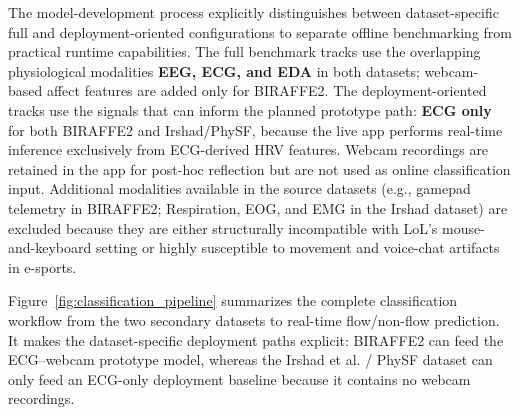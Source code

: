 The model-development process explicitly distinguishes between dataset-specific full and deployment-oriented configurations to separate offline benchmarking from practical runtime capabilities. The full benchmark tracks use the overlapping physiological modalities \textbf{EEG, ECG, and EDA} in both datasets; webcam-based affect features are added only for BIRAFFE2. The deployment-oriented tracks use the signals that can inform the planned prototype path: \textbf{ECG only} for both BIRAFFE2 and Irshad/PhySF, because the live app performs real-time inference exclusively from ECG-derived HRV features. Webcam recordings are retained in the app for post-hoc reflection but are not used as online classification input. Additional modalities available in the source datasets (e.g., gamepad telemetry in BIRAFFE2; Respiration, EOG, and EMG in the Irshad dataset) are excluded because they are either structurally incompatible with LoL's mouse-and-keyboard setting or highly susceptible to movement and voice-chat artifacts in e-sports.

Figure~\ref{fig:classification_pipeline} summarizes the complete classification workflow from the two secondary datasets to real-time flow/non-flow prediction. It makes the dataset-specific deployment paths explicit: BIRAFFE2 can feed the ECG--webcam prototype model, whereas the Irshad et al. / PhySF dataset can only feed an ECG-only deployment baseline because it contains no webcam recordings.

